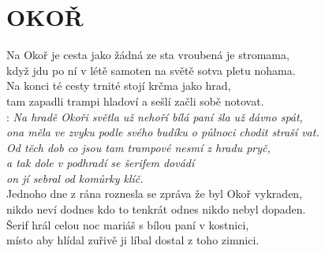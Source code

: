 \section*{\Huge OKOŘ}

Na Okoř je cesta jako žádná ze sta vroubená je stromama,\\
když jdu po ní v létě samoten na světě sotva pletu nohama.\\
Na konci té cesty trnité stojí krčma jako hrad,\\
tam zapadli trampi hladoví a sešlí začli sobě notovat.\\

\textregistered: \emph{Na hradě Okoři světla už nehoří bílá paní šla už dávno spát,\\
ona měla ve zvyku podle svého budíku o půlnoci chodit straší vat.\\
Od těch dob co jsou tam trampové nesmí z hradu pryč,\\
a tak dole v podhradí se šerifem dovádí\\
on jí sebral od komůrky klíč.}\\

Jednoho dne z rána roznesla se zpráva že byl Okoř vykraden,\\
nikdo neví dodnes kdo to tenkrát odnes nikdo nebyl dopaden.\\
Šerif hrál celou noc mariáš s bílou paní v kostnici,\\
místo aby hlídal zuřivě ji líbal dostal z toho zimnici.\\

\textregistered

\newpage
